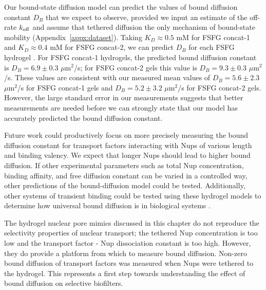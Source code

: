 Our bound-state diffusion model can predict the values of bound diffusion constant $D_B$ that we expect to observe, provided we input an estimate of the off-rate $k_{\rm off}$ and assume that tethered diffusion the only mechanism of bound-state mobility (Appendix~\ref{appx:dataset}).  Taking $K_D \approx 0.5$ mM for FSFG concat-1 and $K_D \approx 0.4$ mM for FSFG concat-2, we can predict $D_B$ for each FSFG hydrogel \cite{hayama18}.  For FSFG concat-1 hydrogels, the predicted bound diffusion constant is $D_B = 6.9\pm0.3$ $\mu$m$^2$/s; for FSFG concat-2 gels this value is $D_B = 9.3\pm0.3$ $\mu$m$^2$/s.  These values are consistent with our measured mean values of $D_B = 5.6\pm2.3$ $\mu$m$^2$/s for FSFG concat-1 gels and $D_B = 5.2\pm3.2$ $\mu$m$^2$/s for FSFG concat-2 gels.  However, the large standard error in our measurements suggests that better measurements are needed before we can strongly state that our model has accurately predicted the bound diffusion constant.


Future work could productively focus on more precisely measuring the bound diffusion constant for transport factors interacting with Nups of various length and binding valency.  We expect that longer Nups should lead to higher bound diffusion.  If other experimental parameters such as total Nup concentration, binding affinity, and free diffusion constant can be varied in a controlled way, other predictions of the bound-diffusion model could be tested.  Additionally, other systems of transient binding could be tested using these hydrogel models to determine how universal bound diffusion is in biological systems \cite{piccolo14,olmsted01,lai09}.

The hydrogel nuclear pore mimics discussed in this chapter do not reproduce the selectivity properties of nuclear transport; the tethered Nup concentration is too low and the transport factor - Nup dissociation constant is too high.  However, they do provide a platform from which to measure bound diffusion.  Non-zero bound diffusion of transport factors was measured when Nups were tethered to the hydrogel.  This represents a first step towards understanding the effect of bound diffusion on selective biofilters.

